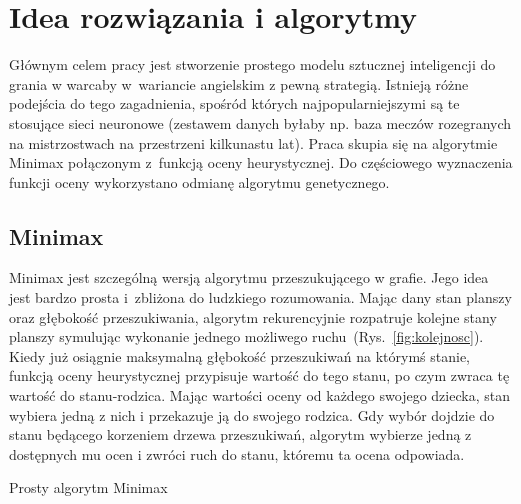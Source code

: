 \chapter{Idea rozwiązania i algorytmy}
\thispagestyle{chapterBeginStyle}
\label{rozdzial2}

Głównym celem pracy jest stworzenie prostego modelu sztucznej inteligencji do grania w warcaby w~wariancie angielskim z pewną strategią. Istnieją różne podejścia do tego zagadnienia, spośród których najpopularniejszymi są te stosujące sieci neuronowe (zestawem danych byłaby np. baza meczów rozegranych na mistrzostwach na przestrzeni kilkunastu lat). Praca skupia się na algorytmie Minimax połączonym z~funkcją oceny heurystycznej. Do częściowego wyznaczenia funkcji oceny wykorzystano odmianę algorytmu genetycznego.

\section{Minimax}

Minimax jest szczególną wersją algorytmu przeszukującego w grafie. Jego idea jest bardzo prosta i~zbliżona do ludzkiego rozumowania. Mając dany stan planszy oraz głębokość przeszukiwania, algorytm rekurencyjnie rozpatruje kolejne stany planszy symulując wykonanie jednego możliwego ruchu~(Rys.~\ref{fig:kolejnosc}). Kiedy już osiągnie maksymalną głębokość przeszukiwań na którymś stanie, funkcją oceny heurystycznej przypisuje wartość do tego stanu, po czym zwraca tę wartość do stanu-rodzica. Mając wartości oceny od każdego swojego dziecka, stan wybiera jedną z nich i przekazuje ją do swojego rodzica. Gdy wybór dojdzie do stanu będącego korzeniem drzewa przeszukiwań, algorytm wybierze jedną z dostępnych mu ocen i zwróci ruch do stanu, któremu ta ocena odpowiada.

{\small
\begin{pseudokod}[H]
\caption{Prosty algorytm Minimax}\label{alg:mine}
\end{pseudokod}
}

